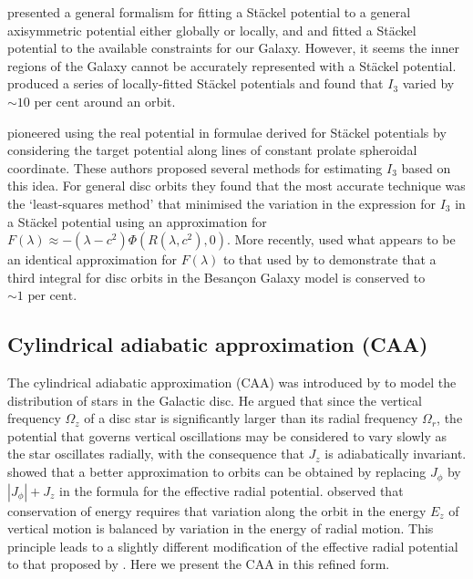 \documentclass[useAMS,usenatbib,fleqn,a4paper]{mn2e}
\def\percent{\text{ per cent}}
\def\percent{\text{ per cent}}
\begin{document}
\cite{DejonghedeZeeuw1988} presented a general formalism for fitting a
St\"ackel potential to a general axisymmetric potential either globally or
locally, and \cite{BatsleerDejonghe} and \cite{Famaey2003} fitted a St\"ackel
potential to the available constraints for our Galaxy.  However, it seems the
inner regions of the Galaxy cannot be accurately represented with a St\"ackel
potential.  \cite{deBruyne2000} produced a series of locally-fitted St\"ackel
potentials and found that $I_3$ varied by $\sim10\percent$ around an orbit.

\cite{KentdeZeeuw1991} pioneered using the real potential in formulae
derived for St\"ackel potentials by considering the target potential along lines of constant prolate spheroidal coordinate. These authors proposed several methods for estimating $I_3$ based on this idea. For general disc orbits they found that the most accurate technique
was the `least-squares method' that minimised the variation in the expression
for $I_3$ in a St\"ackel potential using an approximation for
$F(\lambda)\approx-(\lambda-c^2)\Phi(R(\lambda,c^2),0)$.  More recently,
\cite{Bienayme2015} used what appears to be an identical approximation for
$F(\lambda)$ to that used by \cite{KentdeZeeuw1991} to demonstrate that a
third integral for disc orbits in the Besan\c con Galaxy model is conserved to
$\sim 1\percent$.

\subsection{Cylindrical adiabatic approximation (CAA)}\label{Method::PAA}

The cylindrical adiabatic approximation (CAA) was introduced by
\cite{Binney2010} to model the distribution of stars in the Galactic disc. He
argued that since the vertical frequency $\Omega_z$ of a disc star is
significantly larger than its radial frequency $\Omega_r$, the potential that
governs vertical oscillations may be considered to vary slowly as the star
oscillates radially, with the consequence that $J_z$ is adiabatically
invariant.  \citet{BinneyMcMillan2011} showed that a better approximation to
orbits can be obtained by replacing $J_\phi$ by $|J_\phi|+J_z$ in the formula
for the effective radial potential.  \citet{Schonrich2012} observed that
conservation of energy requires that variation along the orbit in the energy
$E_z$ of vertical motion is balanced by variation in the energy of radial
motion. This principle leads to a slightly different modification of the
effective radial potential to that proposed by \citet{BinneyMcMillan2011}.
Here we present the CAA in this refined form.
\end{document}

